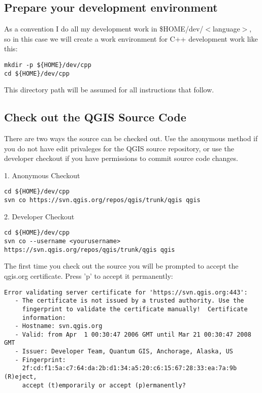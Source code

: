 \subsection{Prepare your development environment}
As a convention I do all my development work in \$HOME/dev/$<$language$>$, so in
this case we will create a work environment for C++ development work like
this:

\begin{verbatim}
mkdir -p ${HOME}/dev/cpp 
cd ${HOME}/dev/cpp 
\end{verbatim}

This directory path will be assumed for all instructions that follow.

\subsection{Check out the QGIS Source Code}
There are two ways the source can be checked out. Use the anonymous method
if you do not have edit privaleges for the QGIS source repository, or use
  the developer checkout if you have permissions to commit source code
  changes.

1. Anonymous Checkout

\begin{verbatim}
cd ${HOME}/dev/cpp 
svn co https://svn.qgis.org/repos/qgis/trunk/qgis qgis
\end{verbatim}

2. Developer Checkout

\begin{verbatim}
cd ${HOME}/dev/cpp 
svn co --username <yourusername> https://svn.qgis.org/repos/qgis/trunk/qgis qgis 
\end{verbatim}

The first time you check out the source you will be prompted to accept the
qgis.org certificate. Press 'p' to accept it permanently:

\begin{verbatim}
Error validating server certificate for 'https://svn.qgis.org:443':
   - The certificate is not issued by a trusted authority. Use the
     fingerprint to validate the certificate manually!  Certificate
     information:
   - Hostname: svn.qgis.org
   - Valid: from Apr  1 00:30:47 2006 GMT until Mar 21 00:30:47 2008 GMT
   - Issuer: Developer Team, Quantum GIS, Anchorage, Alaska, US
   - Fingerprint:
     2f:cd:f1:5a:c7:64:da:2b:d1:34:a5:20:c6:15:67:28:33:ea:7a:9b (R)eject,
     accept (t)emporarily or accept (p)ermanently?  
\end{verbatim}

